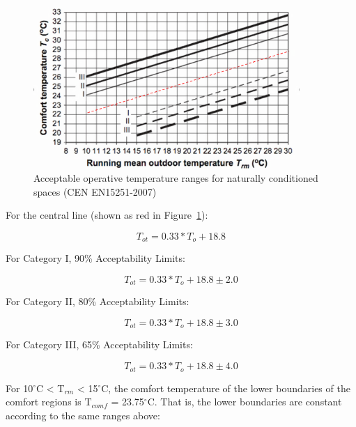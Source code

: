 \begin{figure}[hbtp] %
\centering
\includegraphics[width=0.9\textwidth, height=0.9\textheight, keepaspectratio=true]{media/image6820.png}
\caption{Acceptable operative temperature ranges for naturally conditioned spaces (CEN EN15251-2007) \protect \label{fig:acceptable-operative-temperature-ranges-for-001}}
\end{figure}

For the central line (shown as red in Figure~\ref{fig:acceptable-operative-temperature-ranges-for-001}):

\begin{equation}
T_{ot} = 0.33*T_o + 18.8
\end{equation}

For Category I, 90\% Acceptability Limits:

\begin{equation}
T_{ot} = 0.33*T_o + 18.8 \pm 2.0
\end{equation}

For Category II, 80\% Acceptability Limits:

\begin{equation}
T_{ot} = 0.33*T_o + 18.8 \pm 3.0
\end{equation}

For Category III, 65\% Acceptability Limits:

\begin{equation}
T_{ot} = 0.33*T_o + 18.8 \pm 4.0
\end{equation}

For 10\(^{\circ}\)C \textless{} T\(_{rm}\) \textless{} 15\(^{\circ}\)C, the comfort temperature of the lower boundaries of the comfort regions is T\(_{comf}\) = 23.75\(^{\circ}\)C. That is, the lower boundaries are constant according to the same ranges above:

